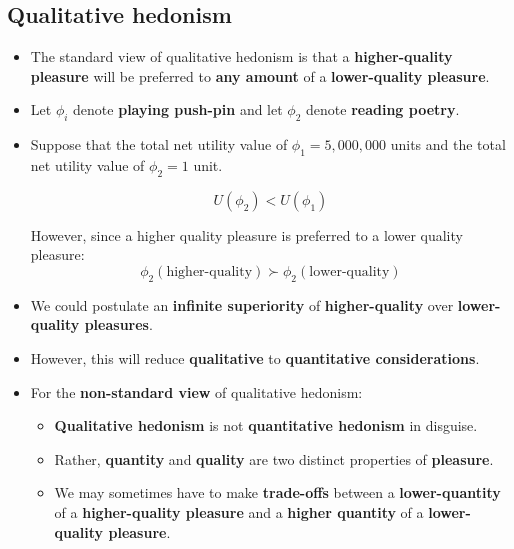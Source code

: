 \documentclass[11pt]{article}
\begin{document}
\subsection{Qualitative hedonism}
\label{sec:org57e4d33}
\begin{itemize}
\item The standard view of qualitative hedonism is that a \textbf{higher-quality pleasure} will be preferred to \textbf{any amount} of a \textbf{lower-quality pleasure}.
\item Let \(\phi_i\) denote \textbf{playing push-pin} and let \(\phi_2\) denote \textbf{reading poetry}.
\item Suppose that the total net utility value of \(\phi_1 = 5,000,000\) units and the total net utility value of \(\phi_2 = 1\) unit.

\[U(\phi_2) < U(\phi_1)\]

However, since a higher quality pleasure is preferred to a lower quality pleasure:
\[\phi_2 (\text{higher-quality}) \succ \phi_2 (\text{lower-quality})\]

\item We could postulate an \textbf{infinite superiority} of \textbf{higher-quality} over \textbf{lower-quality pleasures}.
\item However, this will reduce \textbf{qualitative} to \textbf{quantitative considerations}.
\item For the \textbf{non-standard view} of qualitative hedonism:
\begin{itemize}
\item \textbf{Qualitative hedonism} is not \textbf{quantitative hedonism} in disguise.
\item Rather, \textbf{quantity} and \textbf{quality} are two distinct properties of \textbf{pleasure}.
\item We may sometimes have to make \textbf{trade-offs} between a \textbf{lower-quantity} of a \textbf{higher-quality pleasure} and a \textbf{higher quantity} of a \textbf{lower-quality pleasure}.
\end{itemize}
\end{itemize}
\end{document}
